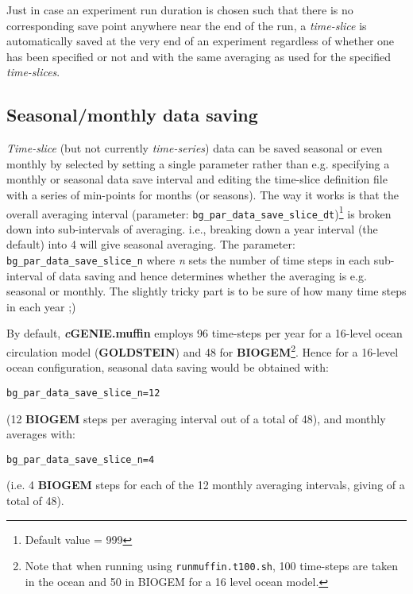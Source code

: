 \documentclass[11pt,fleqn]{book} %
\begin{document}
Just in case an experiment run duration is chosen such that there is no corresponding save point anywhere near the end of the run, a \textit{time-slice} is automatically saved at the very end of an experiment regardless of whether one has been specified or not and with the same averaging as used for the specified \textit{time-slices}.

%
\subsection{Seasonal/monthly data saving}

\textit{Time-slice} (but not currently \textit{time-series}) data can be saved seasonal or even monthly by selected by setting a single parameter rather than e.g. specifying a monthly or seasonal data save interval and editing the time-slice definition file with a series of min-points for months (or seasons).
The way it works is that the overall averaging interval (parameter: \texttt{bg\_par\_data\_save\_slice\_dt})\footnote{Default value = 999} is broken down into sub-intervals of averaging. i.e., breaking down a year interval (the default) into 4 will give seasonal averaging. The parameter: \texttt{bg\_par\_data\_save\_slice\_n} where \textit{n} sets the number of time steps in each sub-interval of data saving and hence determines whether the averaging is e.g. seasonal or monthly. The slightly tricky part is to be sure of how many time steps in each year ;) 

By default, \textbf{\textit{c}GENIE.muffin} employs 96 time-steps per year for a 16-level ocean circulation model (\textbf{GOLDSTEIN}) and 48 for \textbf{BIOGEM}\footnote{Note that when running using \texttt{runmuffin.t100.sh}, 100 time-steps are taken in the ocean and 50 in BIOGEM for a 16 level ocean model.}. Hence for a 16-level ocean configuration, seasonal data saving would be obtained with:
\begin{verbatim}bg_par_data_save_slice_n=12\end{verbatim}
(12 \textbf{BIOGEM} steps per averaging interval out of a total of 48), and monthly averages with:
\begin{verbatim}bg_par_data_save_slice_n=4\end{verbatim}
(i.e. 4 \textbf{BIOGEM} steps for each of the 12 monthly averaging intervals, giving of a total of 48).
\end{document}
